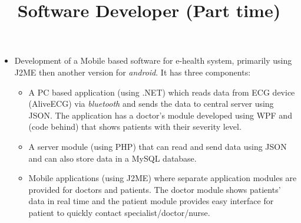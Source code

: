 \begin{resume}
\title{\bf Software Developer (Part time)}
\begin{position}
\vspace*{-.2cm}
\begin{itemize}
\item Development of a Mobile based software for e-health system, primarily using J2ME then another version for \textit{android}. It has three components: 
	\begin{itemize}
		\item A PC based application (using \CSharp.NET) which reads data from ECG device (AliveECG) via \textit{bluetooth} and sends the data to central server using JSON. The application has a doctor's module developed using WPF and \CSharp (code behind) that shows patients with their severity level.
		\item A server module (using PHP) that can read and send data using JSON and  can also store data in a MySQL database.
		\item Mobile applications (using J2ME) where separate application modules are provided for doctors and patients. The doctor module shows patients' data in real time and the patient module provides easy interface for patient to quickly contact specialist/doctor/nurse.   
	\end{itemize}
\end{itemize}
\end{position}
\vspace*{-.2cm}

\end{resume}

